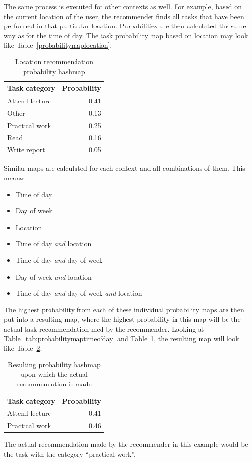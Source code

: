 The same process is executed for other contexts as well. For example, based on the current location of the user, the recommender finds all tasks that have been performed in that particular location. Probabilities are then calculated the same way as for the time of day. The task probability map based on location may look like Table~\ref{probabilitymaplocation}.
\begin{table}[tbp]
  \centering
  \begin{tabular}{|l|r|}
	\hline
	\textbf{Task category} & \textbf{Probability} \\
	\hline
	Attend lecture & 0.41 \\
	\hline
	Other & 0.13 \\
	\hline
	Practical work & 0.25 \\
	\hline
	Read & 0.16 \\
	\hline
	Write report & 0.05 \\
	\hline
  \end{tabular}
  \caption{Location recommendation probability hashmap}
  \label{tab:probabilitymaplocation}
\end{table}

Similar maps are calculated for each context and all combinations of them. This means:
\begin{itemize}
	\item Time of day
	\item Day of week
	\item Location
	\item Time of day \emph{and} location
	\item Time of day \emph{and} day of week
	\item Day of week \emph{and} location
	\item Time of day \emph{and} day of week \emph{and} location
\end{itemize}
The highest probability from each of these individual probability maps are then put into a resulting map, where the highest probability in this map will be the actual task recommendation med by the recommender. Looking at Table~\ref{tab:probabilitymaptimeofday} and Table~\ref{tab:probabilitymaplocation}, the resulting map will look like Table~\ref{tab:probabilitymapresult}.
\begin{table}[tbp]
  \centering
  \begin{tabular}{|l|r|}
	\hline
	\textbf{Task category} & \textbf{Probability} \\
	\hline
	Attend lecture & 0.41 \\
	\hline
	Practical work & 0.46 \\
	\hline
  \end{tabular}
  \caption{Resulting probability hashmap upon which the actual recommendation is made}
  \label{tab:probabilitymapresult}
\end{table}
The actual recommendation made by the recommender in this example would be the task with the category ``practical work''.

